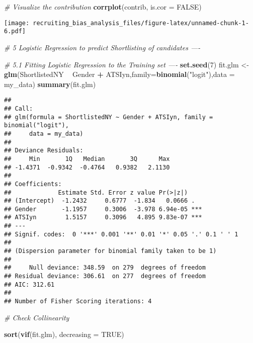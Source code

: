 \documentclass[]{article}
\newenvironment{Shaded}{\begin{snugshade}}{\end{snugshade}}
\newcommand{\KeywordTok}[1]{\textcolor[rgb]{0.13,0.29,0.53}{\textbf{#1}}}
\newcommand{\DataTypeTok}[1]{\textcolor[rgb]{0.13,0.29,0.53}{#1}}
\newcommand{\DecValTok}[1]{\textcolor[rgb]{0.00,0.00,0.81}{#1}}
\newcommand{\StringTok}[1]{\textcolor[rgb]{0.31,0.60,0.02}{#1}}
\newcommand{\CommentTok}[1]{\textcolor[rgb]{0.56,0.35,0.01}{\textit{#1}}}
\newcommand{\OtherTok}[1]{\textcolor[rgb]{0.56,0.35,0.01}{#1}}
\newcommand{\OperatorTok}[1]{\textcolor[rgb]{0.81,0.36,0.00}{\textbf{#1}}}
\newcommand{\NormalTok}[1]{#1}
\begin{document}
\begin{Shaded}
\begin{Highlighting}[]
\CommentTok{# Visualize the contribution}
\KeywordTok{corrplot}\NormalTok{(contrib, }\DataTypeTok{is.cor =} \OtherTok{FALSE}\NormalTok{)}
\end{Highlighting}
\end{Shaded}

\texttt{[image: recruiting\_bias\_analysis\_files/figure-latex/unnamed-chunk-1-6.pdf]}

\begin{Shaded}
\begin{Highlighting}[]
\CommentTok{# 5 Logistic Regression to predict Shortlisting of candidates ----}

\CommentTok{# 5.1 Fitting Logistic Regression to the Training set ----}
\KeywordTok{set.seed}\NormalTok{(}\DecValTok{7}\NormalTok{)}
\NormalTok{fit.glm <-}\StringTok{ }\KeywordTok{glm}\NormalTok{(ShortlistedNY }\OperatorTok{~}\StringTok{ }\NormalTok{Gender }\OperatorTok{+}\StringTok{ }\NormalTok{ATSIyn,}\DataTypeTok{family=}\KeywordTok{binomial}\NormalTok{(}\StringTok{"logit"}\NormalTok{),}\DataTypeTok{data =}\NormalTok{ my_data)}
\KeywordTok{summary}\NormalTok{(fit.glm)}
\end{Highlighting}
\end{Shaded}

\begin{verbatim}
## 
## Call:
## glm(formula = ShortlistedNY ~ Gender + ATSIyn, family = binomial("logit"), 
##     data = my_data)
## 
## Deviance Residuals: 
##     Min       1Q   Median       3Q      Max  
## -1.4371  -0.9342  -0.4764   0.9382   2.1130  
## 
## Coefficients:
##             Estimate Std. Error z value Pr(>|z|)    
## (Intercept)  -1.2432     0.6777  -1.834   0.0666 .  
## Gender       -1.1957     0.3006  -3.978 6.94e-05 ***
## ATSIyn        1.5157     0.3096   4.895 9.83e-07 ***
## ---
## Signif. codes:  0 '***' 0.001 '**' 0.01 '*' 0.05 '.' 0.1 ' ' 1
## 
## (Dispersion parameter for binomial family taken to be 1)
## 
##     Null deviance: 348.59  on 279  degrees of freedom
## Residual deviance: 306.61  on 277  degrees of freedom
## AIC: 312.61
## 
## Number of Fisher Scoring iterations: 4
\end{verbatim}

\begin{Shaded}
\begin{Highlighting}[]
\CommentTok{# Check Collinearity}

\KeywordTok{sort}\NormalTok{(}\KeywordTok{vif}\NormalTok{(fit.glm), }\DataTypeTok{decreasing =} \OtherTok{TRUE}\NormalTok{)}
\end{Highlighting}
\end{Shaded}
\end{document}
